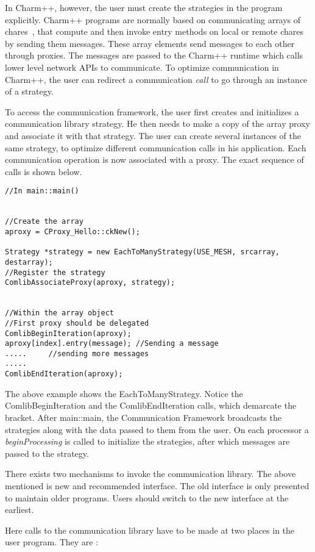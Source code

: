 In Charm++, however, the user must create the strategies in the
program explicitly.  Charm++ programs are normally based on
communicating arrays of chares~\cite{ArraysJournal03}, that compute
and then invoke entry methods on local or remote chares by sending
them messages. These array elements send messages to each other
through proxies. The messages are passed to the Charm++ runtime which
calls lower level network APIs to communicate. To optimize
communication in Charm++, the user can redirect a communication {\em
call} to go through an instance of a strategy.

To access the communication framework, the user first creates and
initializes a communication library strategy. He then needs to make a
copy of the array proxy and associate it with that strategy.  The user
can create several instances of the same strategy, to optimize
different communication calls in his application. Each communication
operation is now associated with a proxy. The exact sequence of calls
is shown below.

\begin{verbatim}
//In main::main()


//Create the array
aproxy = CProxy_Hello::ckNew();

Strategy *strategy = new EachToManyStrategy(USE_MESH, srcarray, destarray);
//Register the strategy
ComlibAssociateProxy(aproxy, strategy);


//Within the array object
//First proxy should be delegated
ComlibBeginIteration(aproxy);  
aproxy[index].entry(message); //Sending a message
.....     //sending more messages
.....
ComlibEndIteration(aproxy);    
\end{verbatim}

The above example shows the EachToManyStrategy. Notice the
ComlibBeginIteration and the ComlibEndIteration calls, which demarcate
the bracket. After main::main, the Communication Framework broadcasts
the strategies along with the data passed to them from the user.  On
each processor a {\em beginProcessing} is called to initialize the
strategies, after which messages are passed to the strategy.

There exists two mechanisms to invoke the communication library. The above 
mentioned is new and recommended interface. The old interface is only 
presented to maintain older programs. Users should switch to the new interface at the earliest. 

Here calls to the communication library have to be made at two places in
the user program. They are :

